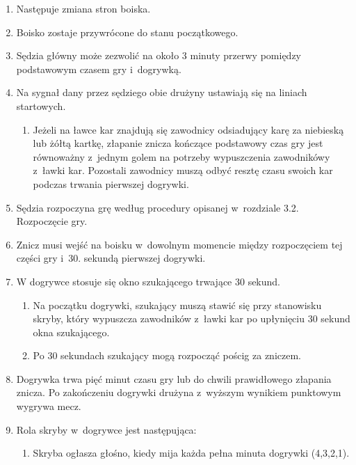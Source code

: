 \documentclass[12pt]{article}
\begin{document}
\begin{enumerate}
	\item Następuje zmiana stron boiska.

	\item Boisko zostaje przywrócone do stanu początkowego.

	\item Sędzia główny może zezwolić na około 3 minuty przerwy pomiędzy
	      podstawowym czasem gry i~dogrywką.

	\item Na sygnał dany przez sędziego obie drużyny ustawiają się na liniach
	      startowych.
	      \begin{enumerate}
		      \item Jeżeli na ławce kar znajdują się zawodnicy odsiadujący karę za
		            niebieską lub żółtą kartkę, złapanie znicza kończące podstawowy czas gry
		            jest równoważny z~jednym golem na potrzeby wypuszczenia zawodnikówy z~ławki kar. Pozostali zawodnicy muszą odbyć resztę czasu swoich kar
		            podczas trwania pierwszej dogrywki.
	      \end{enumerate}

	\item Sędzia rozpoczyna grę według procedury opisanej w~rozdziale 3.2.
	      Rozpoczęcie gry.

	\item Znicz musi wejść na boisku w~dowolnym momencie między rozpoczęciem
	      tej części gry i~30. sekundą pierwszej dogrywki.

	\item W dogrywce stosuje się okno szukającego trwające 30 sekund.
	      \begin{enumerate}
		      \item Na początku dogrywki, szukający muszą stawić się przy stanowisku
		            skryby, który wypuszcza zawodników z~ławki kar po upłynięciu 30 sekund
		            okna szukającego.

		      \item Po 30 sekundach szukający mogą rozpocząć pościg za zniczem.
	      \end{enumerate}

	\item Dogrywka trwa pięć minut czasu gry lub do chwili prawidłowego
	      złapania znicza. Po zakończeniu dogrywki drużyna z~wyższym wynikiem
	      punktowym wygrywa mecz.

	\item Rola skryby w~dogrywce jest następująca:
	      \begin{enumerate}
		      \item  Skryba ogłasza głośno, kiedy mija każda pełna minuta dogrywki
		            (4,3,2,1).


\end{enumerate}
\end{enumerate}
\end{document}
